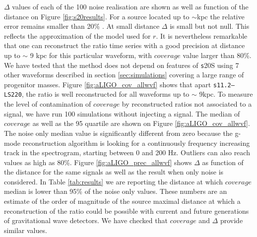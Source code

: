 $\Delta$ values of each of the 100 noise realisation are shown as well as function of the distance
on Figure \ref{fig:s20results}. For a source located up to $\sim$\unit[10]{kpc} the relative error
remains smaller than 20\% . At small distance
$\Delta$ is small but not null. This reflects the approximation of the model used for $r$.
It is nevertheless remarkable that one can reconstruct the ratio time series with a good
precision at distance up to $\sim$ 9 kpc for this particular waveform, with $coverage$ value
larger than 80\%.
We have tested that the method does not depend on features of {\texttt s20S} using  7
other waveforms  described in section \ref{sec:simulations} covering
a large range of progenitor masses.
Figure \ref{fig:aLIGO_cov_allwvf} shows that apart {\tt s11.2--LS220}, the ratio is well
reconstructed for all waveforms up to $\sim$ 9kpc.
To measure the level of contamination of $coverage$ by reconstructed ratios not associated to a
signal, we have run 100 simulations without injecting a signal. The median of $coverage$ as well as
the 95 quartile are shown on Figure \ref{fig:aLIGO_cov_allwvf}. The noise only median value is
significantly different from zero because the g-mode reconstruction algorithm is looking for a
continuously frequency increasing track in the spectrogram, starting between 0 and 200 Hz.
Outliers can also reach values as high as 80\%.
Figure \ref{fig:aLIGO_prec_allwvf} shows $\Delta$ as function of the distance for the same signals
as well as the result when only noise is considered.
In Table \ref{tab:results} we are reporting the distance at which $coverage$ median is lower than
95\% of the noise only values. These numbers are an estimate of the order of magnitude of the 
source maximal distance at which a reconstruction of the ratio could be possible with current
and future generations of gravitational wave detectors. We have checked that $coverage$ and $\Delta$
provide similar values.


